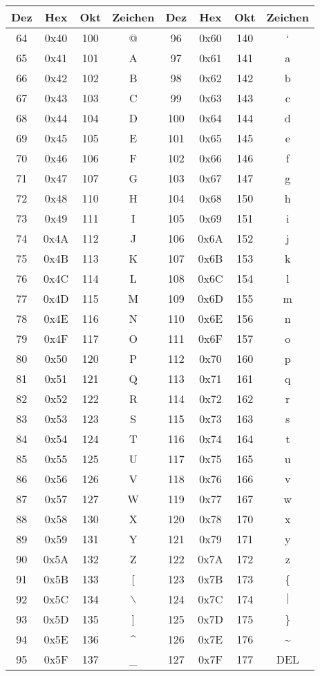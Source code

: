 \documentclass[10pt,a5paper]{report}
\begin{document}
\newpage
    \begin{longtable}{|c|c|c|c||c|c|c|c|}
    \hline
    Dez & Hex & Okt & Zeichen & Dez & Hex & Okt & Zeichen\\
    \hline
    64 & 0x40 & 100 & @ & 96 & 0x60 & 140 & ` \\
    65 & 0x41 & 101 & A & 97 & 0x61 & 141 & a \\
    66 & 0x42 & 102 & B & 98 & 0x62 & 142 & b \\
    67 & 0x43 & 103 & C & 99 & 0x63 & 143 & c \\
    68 & 0x44 & 104 & D & 100 & 0x64 & 144 & d \\
    69 & 0x45 & 105 & E & 101 & 0x65 & 145 & e \\
    70 & 0x46 & 106 & F & 102 & 0x66 & 146 & f \\
    71 & 0x47 & 107 & G & 103 & 0x67 & 147 & g \\
    72 & 0x48 & 110 & H & 104 & 0x68 & 150 & h \\
    73 & 0x49 & 111 & I & 105 & 0x69 & 151 & i \\
    74 & 0x4A & 112 & J & 106 & 0x6A & 152 & j \\
    75 & 0x4B & 113 & K & 107 & 0x6B & 153 & k \\
    76 & 0x4C & 114 & L & 108 & 0x6C & 154 & l \\
    77 & 0x4D & 115 & M & 109 & 0x6D & 155 & m \\
    78 & 0x4E & 116 & N & 110 & 0x6E & 156 & n \\
    79 & 0x4F & 117 & O & 111 & 0x6F & 157 & o \\
    80 & 0x50 & 120 & P & 112 & 0x70 & 160 & p \\
    81 & 0x51 & 121 & Q & 113 & 0x71 & 161 & q \\
    82 & 0x52 & 122 & R & 114 & 0x72 & 162 & r \\
    83 & 0x53 & 123 & S & 115 & 0x73 & 163 & s \\
    84 & 0x54 & 124 & T & 116 & 0x74 & 164 & t \\
    85 & 0x55 & 125 & U & 117 & 0x75 & 165 & u \\
    86 & 0x56 & 126 & V & 118 & 0x76 & 166 & v \\
    87 & 0x57 & 127 & W & 119 & 0x77 & 167 & w \\
    88 & 0x58 & 130 & X & 120 & 0x78 & 170 & x \\
    89 & 0x59 & 131 & Y & 121 & 0x79 & 171 & y \\
    90 & 0x5A & 132 & Z & 122 & 0x7A & 172 & z \\
    91 & 0x5B & 133 & [ & 123 & 0x7B & 173 & \{ \\
    92 & 0x5C & 134 & $\backslash$ & 124 & 0x7C & 174& $\vert$ \\
    93 & 0x5D & 135 & ] & 125 & 0x7D & 175 & \} \\
    94 & 0x5E & 136 & \^{} & 126 & 0x7E & 176 & \textasciitilde \\
    95 & 0x5F & 137 & \_ & 127 & 0x7F & 177 & DEL \\
    \hline
    \end{longtable}
    \newpage
    
\end{document}
